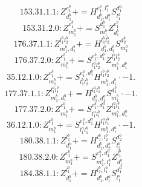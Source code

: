 \documentclass[letterpaper,10pt,fleqn,leqno,onecolumn]{article}
\begin{document}
\begin{equation} \;\;\;\;\;\;  153.31.1.1: Z^{e_{1}^{b}}_{d_{1}^{b}}+=H^{e_{1}^{b},l_{1}^{a}}_{d_{1}^{b},d_{1}^{a}}S^{d_{1}^{a}}_{l_{1}^{a}} \end{equation}
\begin{equation} \;\;\;\;\;\;  153.31.2.0: Z^{e_{1}^{b}}_{m_{1}^{b}}+=S^{d_{1}^{b}}_{m_{1}^{b}}Z^{e_{1}^{b}}_{d_{1}^{b}} \end{equation}
\begin{equation} \;\;\;\;\;\;  176.37.1.1: Z^{l_{1}^{b}l_{2}^{b}}_{m_{1}^{b},d_{1}^{b}}+=H^{l_{1}^{b}l_{2}^{b}}_{d_{1}^{b},d_{2}^{b}}S^{d_{2}^{b}}_{m_{1}^{b}} \end{equation}
\begin{equation} \;\;\;\;\;\;  176.37.2.0: Z^{e_{1}^{b}}_{m_{1}^{b}}+=S^{e_{1}^{b},d_{1}^{b}}_{l_{1}^{b}l_{2}^{b}}Z^{l_{1}^{b}l_{2}^{b}}_{m_{1}^{b},d_{1}^{b}} \end{equation}
\begin{equation} \;\;\;\;\;\;  35.12.1.0: Z^{e_{1}^{b}}_{m_{1}^{b}}+=S^{e_{1}^{b},d_{1}^{b}}_{l_{1}^{b}l_{2}^{b}}H^{l_{1}^{b}l_{2}^{b}}_{m_{1}^{b},d_{1}^{b}}\cdot -1. \end{equation}
\begin{equation} \;\;\;\;\;\;  177.37.1.1: Z^{l_{1}^{a}l_{1}^{b}}_{m_{1}^{b},d_{1}^{a}}+=H^{l_{1}^{a}l_{1}^{b}}_{d_{1}^{b},d_{1}^{a}}S^{d_{1}^{b}}_{m_{1}^{b}}\cdot -1. \end{equation}
\begin{equation} \;\;\;\;\;\;  177.37.2.0: Z^{e_{1}^{b}}_{m_{1}^{b}}+=S^{e_{1}^{b},d_{1}^{a}}_{l_{1}^{a}l_{1}^{b}}Z^{l_{1}^{a}l_{1}^{b}}_{m_{1}^{b},d_{1}^{a}} \end{equation}
\begin{equation} \;\;\;\;\;\;  36.12.1.0: Z^{e_{1}^{b}}_{m_{1}^{b}}+=S^{e_{1}^{b},d_{1}^{a}}_{l_{1}^{a}l_{1}^{b}}H^{l_{1}^{a}l_{1}^{b}}_{m_{1}^{b},d_{1}^{a}}\cdot -1. \end{equation}
\begin{equation} \;\;\;\;\;\;  180.38.1.1: Z^{l_{1}^{b}}_{d_{1}^{b}}+=H^{l_{1}^{b},l_{2}^{b}}_{d_{1}^{b},d_{2}^{b}}S^{d_{2}^{b}}_{l_{2}^{b}} \end{equation}
\begin{equation} \;\;\;\;\;\;  180.38.2.0: Z^{e_{1}^{b}}_{m_{1}^{b}}+=S^{e_{1}^{b},d_{1}^{b}}_{m_{1}^{b},l_{1}^{b}}Z^{l_{1}^{b}}_{d_{1}^{b}} \end{equation}
\begin{equation} \;\;\;\;\;\;  184.38.1.1: Z^{l_{1}^{b}}_{d_{1}^{b}}+=H^{l_{1}^{b},l_{1}^{a}}_{d_{1}^{b},d_{1}^{a}}S^{d_{1}^{a}}_{l_{1}^{a}} \end{equation}
\end{document}
